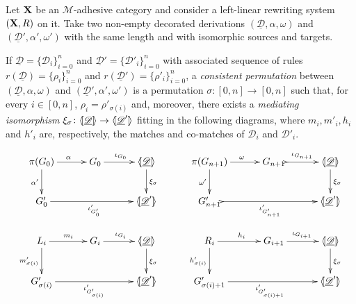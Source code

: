 \documentclass[a4paper,UKenglish,cleveref,pdftex,thm-restate,numberwithinsect]{lipics-v2021}
\def\R{\mathsf{R}}
\def\X{\textbf {\textup{X}}}
\def\G{\textbf {\textup{G}}}
\newcommand{\dder}[1]{\mathscr{#1}}
\newcommand{\der}[1]{\underline{\dder{#1}}}
\newcommand{\lpro}{\langle \hspace{-1.85pt}[}
\newcommand{\rpro}{]\hspace{-1.85pt}\rangle}
\newcommand{\tpro}[1]{\lpro \der{#1}\rpro}
\begin{document}
\begin{definition}
  \label{def:permcon}
  Let $\X$ be an $\mathcal{M}$-adhesive category and consider a
  left-linear rewriting system $(\X, \R)$ on it.  Take two
  non-empty decorated derivations $(\der{D}, \alpha, \omega)$ and
  $(\der{D}', \alpha', \omega')$ with the same length and with
  isomorphic sources and targets.

  If $\der{D}=\{\dder{D}_i\}_{i=0}^n$ and
  $\der{D}'=\{\dder{D}'_i\}_{i=0}^n$ with associated sequence of rules
  $r(\der{D})=\{\rho_i\}_{i=0}^n$ and
  $r(\der{D}')=\{\rho'_i\}_{i=0}^n$, a \emph{consistent permutation}
  between $(\der{D}, \alpha, \omega)$ and
  $(\der{D}', \alpha', \omega')$ is a permutation
  $\sigma\colon [0,n]\to [0,n]$ such that, for every $i\in [0,n]$,
  $\rho_i=\rho'_{\sigma(i)}$ and, moreover, there exists a
  \emph{mediating isomorphism}
  $\xi_\sigma\colon \tpro{D} \to \lpro \der{D}' \rpro$ fitting in the
  following diagrams, where $m_i, m'_i, h_i$ and $h'_i$ are,
  respectively, the matches and co-matches of $\dder{D}_i$ and
  $\dder{D}'_i$.

  \[
    \xymatrix@C=30pt{\pi(G_0)\ar[r]^{\alpha} \ar[d]_{\alpha'} & G_0
      \ar[r]^{\iota_{G_0}} &\tpro{D} \ar[d]^{\xi_\sigma}& \pi(G_{n+1})
      \ar[r]^{\omega} \ar[d]_{\omega'} & G_{n+1}
      \ar@{>->}[r]^{\iota_{G_{n+1}}} &\tpro{D} \ar[d]^{\xi_\sigma}\\
      G'_0 \ar[rr]_{\iota'_{G'_0}} & &\lpro \der{D}' \rpro& G'_{n+1}
      \ar@{>->}[rr]_{\iota'_{G'_{n+1}}} & &\lpro \der{D}' \rpro\\L_i
      \ar[r]^{m_i} \ar[d]_{m'_{\sigma(i)}}& G_i \ar[r]^{\iota_{G_i}}
      &\tpro{D} \ar[d]^{\xi_\sigma} & R_i \ar[r]^{h_i}
      \ar[d]_{h'_{\sigma(i)}}& G_{i+1} \ar[r]^{\iota_{G_{i+1}}}
      &\tpro{D} \ar[d]^{\xi_\sigma} \\G'_{\sigma(i)}
      \ar[rr]_{\iota'_{G'_{\sigma(i)}}}&& \lpro \der{D}' \rpro&
      G'_{\sigma(i)+1} \ar[rr]_{\iota'_{G'_{\sigma(i)+1}}}&& \lpro
      \der{D}' \rpro}
  \]
\end{definition}
\end{document}
